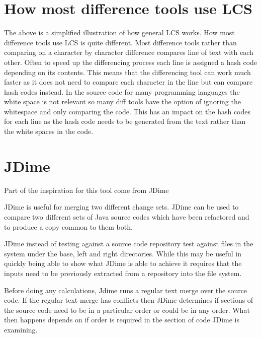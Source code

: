 \section{How most difference tools use LCS}
The above is a simplified illustration of how general LCS works.
How most difference tools use LCS is quite different.
Most difference tools rather than comparing on a character by character difference compares line of text with each other.
Often to speed up the differencing process each line is assigned a hash code depending on its contents. 
This means that the differencing tool can work much faster as it does not need to compare each character in the line but can compare hash codes instead.
In the source code for many programming languages the white space is not relevant so many diff tools have the option of ignoring the whitespace and only comparing the code.
This has an impact on the hash codes for each line as the hash code needs to be generated from the text rather than the white spaces in the code.
% 
 
 



\section{JDime}
Part of the inspiration for this tool come from JDime



JDime is useful for merging two different change sets. 
JDime can be used to compare two different sets of Java source codes which have been refactored and to produce a copy common to them both.  

JDime instead of testing against a source code repository test against files in the system under the base, left and right directories.
While this may be useful in quickly being able to show what JDime is able to achieve it requires that the inputs need to be previously extracted from a repository into the file system.

Before doing any calculations, Jdime runs a regular text merge over the source code.  
If the regular text merge has conflicts then JDime determines if sections of the source code need to be in a particular order or could be in any order.
What then happens depends on if order is required in the section of code JDime is examining.


